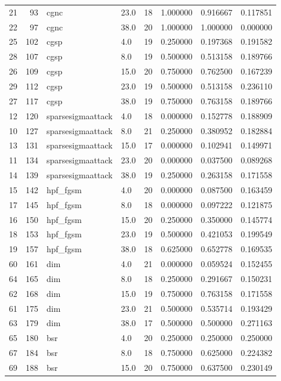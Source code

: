 \begin{tabular}{lrllrrrr}
21 & 93 & cgnc & 23.0 & 18 & 1.000000 & 0.916667 & 0.117851 \\
22 & 97 & cgnc & 38.0 & 20 & 1.000000 & 1.000000 & 0.000000 \\
25 & 102 & cgsp & 4.0 & 19 & 0.250000 & 0.197368 & 0.191582 \\
28 & 107 & cgsp & 8.0 & 19 & 0.500000 & 0.513158 & 0.189766 \\
26 & 109 & cgsp & 15.0 & 20 & 0.750000 & 0.762500 & 0.167239 \\
29 & 112 & cgsp & 23.0 & 19 & 0.500000 & 0.513158 & 0.236110 \\
27 & 117 & cgsp & 38.0 & 19 & 0.750000 & 0.763158 & 0.189766 \\
12 & 120 & sparsesigmaattack & 4.0 & 18 & 0.000000 & 0.152778 & 0.188909 \\
10 & 127 & sparsesigmaattack & 8.0 & 21 & 0.250000 & 0.380952 & 0.182884 \\
13 & 131 & sparsesigmaattack & 15.0 & 17 & 0.000000 & 0.102941 & 0.149971 \\
11 & 134 & sparsesigmaattack & 23.0 & 20 & 0.000000 & 0.037500 & 0.089268 \\
14 & 139 & sparsesigmaattack & 38.0 & 19 & 0.250000 & 0.263158 & 0.171558 \\
15 & 142 & hpf_fgsm & 4.0 & 20 & 0.000000 & 0.087500 & 0.163459 \\
17 & 145 & hpf_fgsm & 8.0 & 18 & 0.000000 & 0.097222 & 0.121875 \\
16 & 150 & hpf_fgsm & 15.0 & 20 & 0.250000 & 0.350000 & 0.145774 \\
18 & 153 & hpf_fgsm & 23.0 & 19 & 0.500000 & 0.421053 & 0.199549 \\
19 & 157 & hpf_fgsm & 38.0 & 18 & 0.625000 & 0.652778 & 0.169535 \\
60 & 161 & dim & 4.0 & 21 & 0.000000 & 0.059524 & 0.152455 \\
64 & 165 & dim & 8.0 & 18 & 0.250000 & 0.291667 & 0.150231 \\
62 & 168 & dim & 15.0 & 19 & 0.750000 & 0.763158 & 0.171558 \\
61 & 175 & dim & 23.0 & 21 & 0.500000 & 0.535714 & 0.193429 \\
63 & 179 & dim & 38.0 & 17 & 0.500000 & 0.500000 & 0.271163 \\
65 & 180 & bsr & 4.0 & 20 & 0.250000 & 0.250000 & 0.250000 \\
67 & 184 & bsr & 8.0 & 18 & 0.750000 & 0.625000 & 0.224382 \\
69 & 188 & bsr & 15.0 & 20 & 0.750000 & 0.637500 & 0.230149 \\

\end{tabular}
